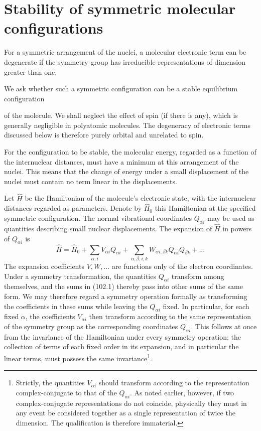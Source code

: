 \section{Stability of symmetric molecular configurations}

For a symmetric arrangement of the nuclei, a molecular electronic term can be degenerate if the symmetry group has irreducible representations of dimension greater than one.

We ask whether such a symmetric configuration can be a stable equilibrium configuration

of the molecule. We shall neglect the effect of spin (if there is any), which is generally negligible in polyatomic molecules. The degeneracy of electronic terms discussed below is therefore purely orbital and unrelated to spin.

For the configuration to be stable, the molecular energy, regarded as a function of the internuclear distances, must have a minimum at this arrangement of the nuclei. This means that the change of energy under a small displacement of the nuclei must contain no term linear in the displacements.

Let $\widehat H$ be the Hamiltonian of the molecule's electronic state, with the internuclear distances regarded as parameters. Denote by $\widehat H_0$ this Hamiltonian at the specified symmetric configuration. The normal vibrational coordinates $Q_{\alpha i}$ may be used as quantities describing small nuclear displacements. The expansion of $\widehat H$ in powers of $Q_{\alpha i}$ is
\begin{equation}
 \widehat H=\widehat H_0+\sum_{\alpha,i}V_{\alpha i}Q_{\alpha i}
 +\sum_{\alpha,\beta,i,k}W_{\alpha i,\beta k}Q_{\alpha i}Q_{\beta k}+\ldots
 \tag{102.1}
\end{equation}
The expansion coefficients $V,W,\ldots$ are functions only of the electron coordinates. Under a symmetry transformation, the quantities $Q_{\alpha i}$ transform among themselves, and the sums in (102.1) thereby pass into other sums of the same form. We may therefore regard a symmetry operation formally as transforming the coefficients in these sums while leaving the $Q_{\alpha i}$ fixed. In particular, for each fixed $\alpha$, the coefficients $V_{\alpha i}$ then transform according to the same representation of the symmetry group as the corresponding coordinates $Q_{\alpha i}$. This follows at once from the invariance of the Hamiltonian under every symmetry operation: the collection of terms of each fixed order in its expansion, and in particular the linear terms, must possess the same invariance\footnote{Strictly, the quantities $V_{\alpha i}$ should transform according to the representation complex-conjugate to that of the $Q_{\alpha i}$. As noted earlier, however, if two complex-conjugate representations do not coincide, physically they must in any event be considered together as a single representation of twice the dimension. The qualification is therefore immaterial.}.

